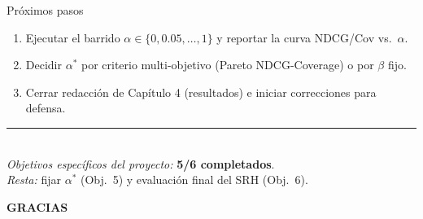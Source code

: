 \documentclass[aspectratio=169,11pt]{beamer}
\begin{document}
\begin{frame}{Pr\'oximos pasos}
	\small
	\begin{enumerate}\setlength\itemsep{4pt}
		\item Ejecutar el barrido $\alpha\in\{0,0.05,\dots,1\}$ y reportar la curva NDCG/Cov vs.\ $\alpha$.
		\item Decidir $\alpha^{*}$ por criterio multi-objetivo (Pareto NDCG-Coverage) o por $\beta$ fijo.
		\item Cerrar redacci\'on de Cap\'itulo 4 (resultados) e iniciar correcciones para defensa.
	\end{enumerate}

	\vspace{0.8em}
	\centering
	{\color{rule}\rule{0.5\linewidth}{0.4pt}}\\[0.5em]
	\textit{Objetivos espec\'ificos del proyecto:} \textbf{5/6 completados}.\\
	\textit{Resta:} fijar $\alpha^{*}$ (Obj.\ 5) y evaluaci\'on final del SRH (Obj.\ 6).
\end{frame}

\begin{frame}[plain]
	\vfill
	\begin{center}
		{\fontsize{60}{72}\selectfont\bfseries\rmfamily\color{navy}GRACIAS}
	\end{center}
	\vfill
\end{frame}
\end{document}
